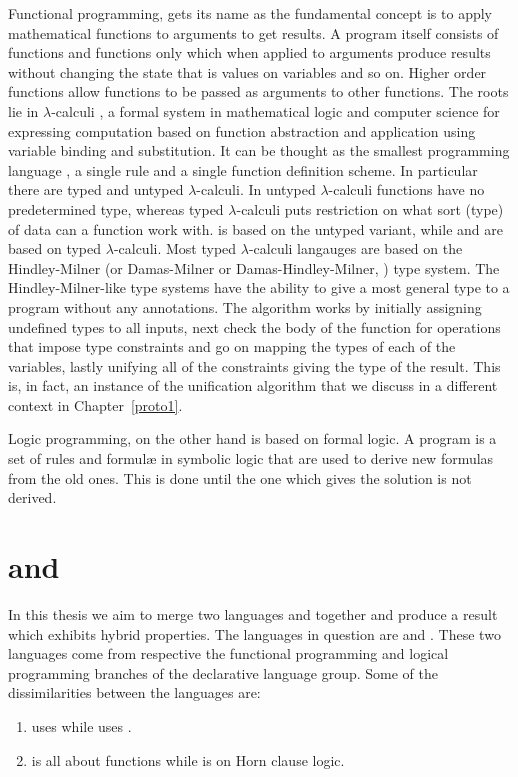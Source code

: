 \documentclass[thesis-solanki.tex]{subfiles}
\begin{document}
Functional programming, \cite{hughes1989functional} gets its name as the fundamental concept is
to apply mathematical functions to arguments to get results.
A program itself consists of functions and functions only which when applied to arguments produce results without
changing the state that is values on variables and so on.
Higher order functions allow functions to be passed as arguments to other functions.
The roots lie in $\lambda$-calculi \cite{website:lambdacalculuswiki}, a formal system in mathematical logic and
computer science for expressing computation based on function abstraction and application using variable binding
and substitution.
It can be thought as the smallest programming language \cite{rojas2004tutorial}, a single rule and a single
function definition scheme.
In particular there are typed and untyped $\lambda$-calculi.
In untyped $\lambda$-calculi functions have no predetermined type, whereas typed $\lambda$-calculi puts restriction
on what sort (type) of data can a function work with.
 is based on the untyped variant, while  and  are based on typed
$\lambda$-calculi.
Most typed $\lambda$-calculi langauges are based on the Hindley-Milner (or Damas-Milner or Damas-Hindley-Milner,
\cite{hindley1969principal,milner1978theory,website:hdmtypesystemwiki}) type system.
The Hindley-Milner-like type systems have the ability to give a most general type to a program
without any annotations.
The algorithm \cite{website:hdmtypesystem} works by initially assigning undefined types to all inputs, next check
the body of the function for operations that impose type constraints and go on mapping the types of each of the 
variables, lastly unifying all of the constraints giving the type of the result.
This is, in fact, an instance of the unification algorithm that we discuss in a different context in Chapter~\ref{proto1}.

Logic programming, \cite{spivey1995introduction} on the other hand is based on formal logic.
A program is a set of rules and formul\ae{} in symbolic logic that are used to derive new formulas from the old
ones.
This is done until the one which gives the solution is not derived.

\section{ and }
In this thesis we aim to merge two languages  and  together and produce a result
which exhibits hybrid properties.
The languages in question are  and .
These two languages come from respective the functional programming and logical programming branches of the
declarative language group.
Some of the dissimilarities between the languages are:
\begin{enumerate}
\item {}
  uses  while  uses
  . 
\item {} is all about functions while  is on Horn clause logic.
\end{enumerate} 
\end{document}
